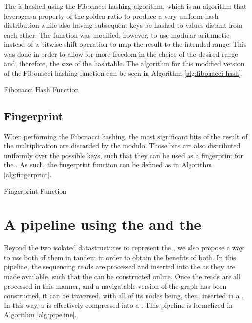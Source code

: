 The \kmer is hashed using the Fibonacci hashing algorithm, which is an algorithm that leverages a property of the golden ratio
to produce a very uniform hash distribution while also having subsequent keys be hashed to values distant from each other. The
function was modified, however, to use modular arithmetic instead of a bitwise shift operation to map the result to the intended
range. This was done in order to allow for more freedom in the choice of the desired range and, therefore, the size of the
hashtable. The algorithm for this modified version of the Fibonacci hashing function can be seen in Algorithm \ref{alg:fibonacci-hash}.

\begin{algorithm}
  \caption{Fibonacci Hash Function}\label{alg:fibonacci-hash}
\end{algorithm}

\subsection{Fingerprint}

When performing the Fibonacci hashing, the most significant bits of the result of the multiplication are discarded by the modulo.
Those bits are also distributed uniformly over the possible keys, such that they can be used as a fingerprint for the \kmer.
As such, the fingerprint function can be defined as in Algorithm \ref{alg:fingerprint}. 

\begin{algorithm}
  \caption{Fingerprint Function}\label{alg:fingerprint}
\end{algorithm}

\section{A pipeline using the \dBCM and the \dBHT}


Beyond the two isolated datastructures to represent the \dBG, we also propose a way to use both of them in tandem in order to obtain
the benefits of both. In this pipeline, the sequencing reads are processed and inserted into the \dBCM as they are made available,
such that the \dBG can be constructed online. Once the reads are all processed in this manner, and a navigatable version of the graph 
has been constructed, it can be traversed, with all of its nodes being, then, inserted in a \dBHT. In this way, a \dBCM is effectively
compressed into a \dBHT. This pipeline is formalized in Algorithm \ref{alg:pipeline}.

